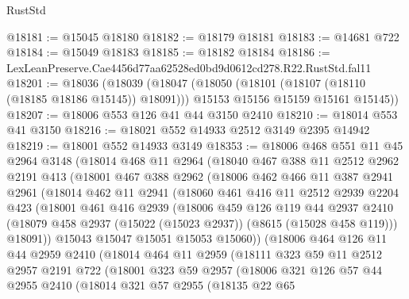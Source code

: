 \begin{lexlean}{RustStd}
\begin{coremodule}
@18181 := @15045 @18180
@18182 := @18179 @18181
@18183 := @14681 @722
@18184 := @15049 @18183
@18185 := @18182 @18184
@18186 := LexLeanPreserve.Cae4456d77aa62528ed0bd9d0612cd278.R22.RustStd.fal11
@18201 := @18036
    (@18039
      (@18047
        (@18050 (@18101 (@18107 (@18110 (@18185 @18186 @15145)) @18091)))
        @15153
        @15156
        @15159
        @15161
        @15145))
@18207 := @18006 @553 @126 @41 @44 @3150 @2410
@18210 := @18014 @553 @41 @3150
@18216 := @18021 @552 @14933 @2512 @3149 @2395 @14942
@18219 := @18001 @552 @14933 @3149
@18353 := @18006
    @468
    @551
    @11
    @45
    @2964
    @3148
    (@18014
      @468
      @11
      @2964
      (@18040
        @467
        @388
        @11
        @2512
        @2962
        @2191
        @413
        (@18001
          @467
          @388
          @2962
          (@18006
            @462
            @466
            @11
            @387
            @2941
            @2961
            (@18014
              @462
              @11
              @2941
              (@18060
                @461
                @416
                @11
                @2512
                @2939
                @2204
                @423
                (@18001
                  @461
                  @416
                  @2939
                  (@18006
                    @459
                    @126
                    @119
                    @44
                    @2937
                    @2410
                    (@18079 @458 @2937 (@15022 (@15023 @2937)) (@8615 (@15028 @458 @119)))
                    @18091))
                @15043
                @15047
                @15051
                @15053
                @15060))
            (@18006
              @464
              @126
              @11
              @44
              @2959
              @2410
              (@18014
                @464
                @11
                @2959
                (@18111
                  @323
                  @59
                  @11
                  @2512
                  @2957
                  @2191
                  @722
                  (@18001
                    @323
                    @59
                    @2957
                    (@18006
                      @321
                      @126
                      @57
                      @44
                      @2955
                      @2410
                      (@18014
                        @321
                        @57
                        @2955
                        (@18135
                          @22
                          @65

\end{coremodule}
\end{lexlean}
